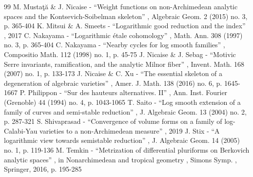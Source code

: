 \documentclass[11pt]{article}
\begin{document}
\begin{thebibliography}{99}
 M. Mustaţă \& J. Nicaise - “Weight functions on non-Archimedean analytic spaces and the Kontsevich-Soibelman skeleton” , Algebraic Geom. 2 (2015) no. 3, p. 365-404
 K. Mitsui \& A. Smeets - “Logarithmic good reduction and the index” , 2017
 C. Nakayama - “Logarithmic étale cohomology” , Math. Ann. 308 (1997) no. 3, p. 365-404
 C. Nakayama - “Nearby cycles for log smooth families” , Compositio Math. 112 (1998) no. 1, p. 45-75
 J. Nicaise \& J. Sebag - “Motivic Serre invariants, ramification, and the analytic Milnor fiber” , Invent. Math. 168 (2007) no. 1, p. 133-173
 J. Nicaise \& C. Xu - “The essential skeleton of a degeneration of algebraic varieties” , Amer. J. Math. 138 (2016) no. 6, p. 1645-1667
 P. Philippon - “Sur des hauteurs alternatives. II” , Ann. Inst. Fourier (Grenoble) 44 (1994) no. 4, p. 1043-1065
 T. Saito - “Log smooth extension of a family of curves and semi-stable reduction” , J. Algebraic Geom. 13 (2004) no. 2, p. 287-321
 S. Shivaprasad - “Convergence of volume forms on a family of log-Calabi-Yau varieties to a non-Archimedean measure” , 2019
 J. Stix - “A logarithmic view towards semistable reduction” , J. Algebraic Geom. 14 (2005) no. 1, p. 119-136
 M. Temkin - “Metrization of differential pluriforms on Berkovich analytic spaces” , in Nonarchimedean and tropical geometry , Simons Symp. , Springer, 2016, p. 195-285
\end{thebibliography}
\end{document}
